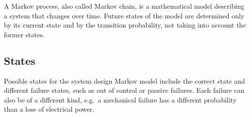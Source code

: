 A Markov process, also called Markov chain, is a mathematical model describing a system that changes over time.
Future states of the model are determined only by its current state and by the transition probability, not taking into account
the former states. 

\subsection{States}\label{subsec:states}
Possible states for the system design Markov model include the correct state and different failure states, such as out of control
or passive failures.
Each failure can also be of a different kind, e.g.\ a mechanical failure has a different probability than a loss of electrical power.

